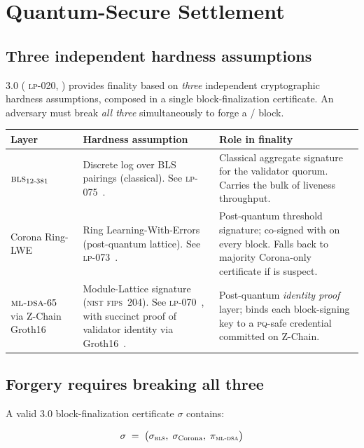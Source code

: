 \section{Quantum-Secure Settlement}
\label{sec:quantum}

\subsection{Three independent hardness assumptions}

\Quasar{} 3.0 (\Lux{} \textsc{lp-020}, \cite{lp-020-quasar-3,lp-105-quasar})
provides finality based on \emph{three} independent cryptographic hardness
assumptions, composed in a single block-finalization certificate. An
adversary must break \emph{all three} simultaneously to forge a
\Lux{}/\Zoo{} block.

\begin{longtable}{p{3.8cm}p{4.5cm}p{6.4cm}}
\toprule
\textbf{Layer} & \textbf{Hardness assumption} & \textbf{Role in finality} \\
\midrule
\endhead
$\textsc{bls}{}_{12\text{-}381}$ & Discrete log over BLS pairings (classical).
   See \Lux{} \textsc{lp-075}~\cite{lp-075-bls}.
   & Classical aggregate signature for the validator quorum.
   Carries the bulk of liveness throughput. \\
Corona Ring-LWE & Ring Learning-With-Errors (post-quantum lattice).
   See \Lux{} \textsc{lp-073}~\cite{lp-073-corona,ring-lwe}.
   & Post-quantum threshold signature; co-signed with \BLS{} on every
   block. Falls back to majority Corona-only certificate if \BLS{}
   is suspect. \\
$\textsc{ml-dsa}{}\text{-}65$ via Z-Chain Groth16 &
   Module-Lattice signature (\textsc{nist} \textsc{fips}~204).
   See \Lux{} \textsc{lp-070}~\cite{lp-070-mldsa,nist-mldsa}, with
   succinct proof of validator identity via Groth16~\cite{groth16}.
   & Post-quantum \emph{identity proof} layer; binds each
   block-signing key to a \textsc{pq}-safe credential committed on
   Z-Chain. \\
\bottomrule
\end{longtable}

\subsection{Forgery requires breaking all three}

A valid \Quasar{} 3.0 block-finalization certificate $\sigma$ contains:

\[
\sigma \;=\; \big( \sigma_{\textsc{bls}{}},\; \sigma_{\text{Corona}},\; \pi_{\textsc{ml-dsa}{}} \big)
\]

